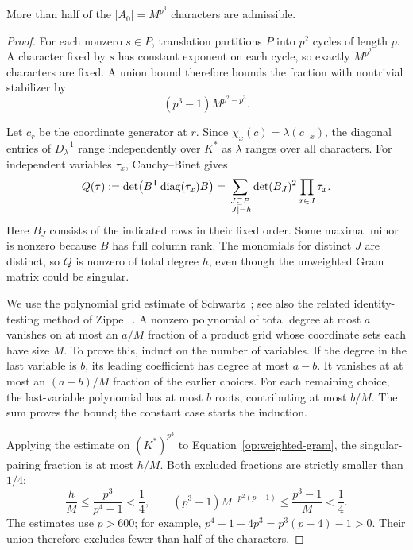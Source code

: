 \begin{lemma}\label{op:good-count}
More than half of the $|A_0|=M^{p^3}$ characters are admissible.
\end{lemma}
\begin{proof}
For each nonzero $s\in P$, translation partitions $P$ into $p^2$ cycles
of length $p$. A character fixed by $s$ has constant exponent on each
cycle, so exactly $M^{p^2}$ characters are fixed. A union bound therefore
bounds the fraction with nontrivial stabilizer by
\[
 (p^3-1)M^{p^2-p^3}.
\]

Let $c_r$ be the coordinate generator at $r$. Since
$\chi_x(c)=\lambda(c_{-x})$, the diagonal entries of $D_\lambda^{-1}$
range independently over $K^*$ as $\lambda$ ranges over all characters.
For independent variables $\tau_x$, Cauchy--Binet gives
\begin{equation}\label{op:weighted-gram}
 Q(\tau):=\det\bigl(B^{\mathsf T}\operatorname{diag}(\tau_x)B\bigr)
 =\sum_{\substack{J\subseteq P\\|J|=h}}\det(B_J)^2\prod_{x\in J}\tau_x.
\end{equation}
Here $B_J$ consists of the indicated rows in their fixed order.
Some maximal minor is nonzero because $B$ has full column rank. The
monomials for distinct $J$ are distinct, so $Q$ is nonzero of total
degree $h$, even though the unweighted Gram matrix could be singular.

We use the polynomial grid estimate of
Schwartz~\cite[Lemma~1 and Corollary~1]{Schwartz1980}; see also the
related identity-testing method of Zippel~\cite{Zippel1979}. A nonzero
polynomial of total degree at most $a$ vanishes on at most an $a/M$
fraction of a product grid whose coordinate sets each have size $M$.
To prove this, induct on the number of variables. If the degree in the
last variable is $b$, its leading coefficient has degree at most $a-b$.
It vanishes at at most an $(a-b)/M$ fraction of the earlier choices.
For each remaining choice, the last-variable polynomial has at most
$b$ roots, contributing at most $b/M$. The sum proves the bound; the
constant case starts the induction.

Applying the estimate on $(K^*)^{p^3}$ to
Equation~\eqref{op:weighted-gram}, the singular-pairing fraction is at
most $h/M$. Both excluded fractions are strictly smaller than $1/4$:
\[
 \frac hM\le\frac{p^3}{p^4-1}<\frac14,\qquad
 (p^3-1)M^{-p^2(p-1)}\le\frac{p^3-1}{M}<\frac14.
\]
The estimates use $p>600$; for example,
$p^4-1-4p^3=p^3(p-4)-1>0$. Their union therefore excludes fewer than
half of the characters.
\end{proof}

